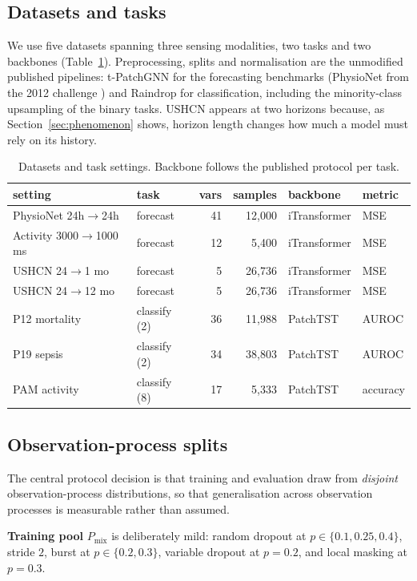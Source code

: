 \documentclass[sigconf,nonacm]{acmart}
\begin{document}
\subsection{Datasets and tasks}
We use five datasets spanning three sensing modalities, two tasks and two backbones
(Table~\ref{tab:datasets}). Preprocessing, splits and normalisation are the unmodified published pipelines:
t-PatchGNN \cite{zhang2024tpatchgnn} for the forecasting benchmarks (PhysioNet from the 2012 challenge
\cite{silva2012physionet}) and Raindrop \cite{zhang2022raindrop} for classification, including the minority-class upsampling of the binary tasks. USHCN appears at two horizons
because, as Section~\ref{sec:phenomenon} shows, horizon length changes how much a model must rely on its
history.

\begin{table}[t]
\caption{Datasets and task settings. Backbone follows the published protocol per task.}
\label{tab:datasets}
\small
\begin{tabular}{llrrll}
\toprule
setting & task & vars & samples & backbone & metric \\
\midrule
PhysioNet 24h$\to$24h & forecast & 41 & 12{,}000 & iTransformer & MSE \\
Activity 3000$\to$1000\,ms & forecast & 12 & 5{,}400 & iTransformer & MSE \\
USHCN 24$\to$1 mo & forecast & 5 & 26{,}736 & iTransformer & MSE \\
USHCN 24$\to$12 mo & forecast & 5 & 26{,}736 & iTransformer & MSE \\
P12 mortality & classify (2) & 36 & 11{,}988 & PatchTST & AUROC \\
P19 sepsis & classify (2) & 34 & 38{,}803 & PatchTST & AUROC \\
PAM activity & classify (8) & 17 & 5{,}333 & PatchTST & accuracy \\
\bottomrule
\end{tabular}
\end{table}

\subsection{Observation-process splits}
\label{sec:splits}
The central protocol decision is that training and evaluation draw from \emph{disjoint} observation-process
distributions, so that generalisation across observation processes is measurable rather than assumed.

\textbf{Training pool} $P_{\mathrm{mix}}$ is deliberately mild: random dropout at $p\in\{0.1,0.25,0.4\}$,
stride $2$, burst at $p\in\{0.2,0.3\}$, variable dropout at $p=0.2$, and local masking at $p=0.3$.
\end{document}
